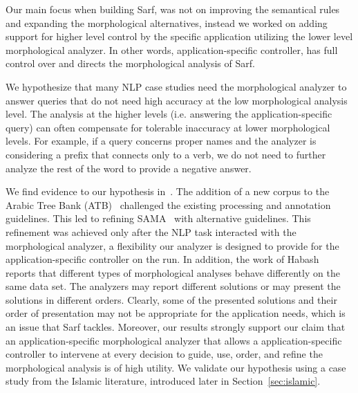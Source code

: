 \documentclass[11pt]{article}
\begin{document}
Our main focus when building Sarf, was not on improving the semantical rules and expanding the morphological alternatives, instead we worked on adding support for higher level control by the specific application utilizing the lower level morphological analyzer. In other words, application-specific controller, has full control over and directs the morphological analysis of Sarf. %

We hypothesize that many NLP case studies need the 
morphological analyzer to answer queries that do not need 
high accuracy at the low morphological analysis level.
The analysis at the higher levels 
(i.e. answering the application-specific query)
can often compensate for 
tolerable inaccuracy at lower morphological levels. 
For example, if a query concerns proper names and the 
analyzer is considering a 
prefix that connects only to a verb,
we do not need to further analyze the rest of the word 
to provide a negative answer.

We find evidence to our hypothesis in~\cite{Maamouri:10}.
The addition of a new corpus to the Arabic Tree Bank 
(ATB)~\cite{Maamouri:04}
challenged the existing processing and 
annotation guidelines. 
This led to refining 
SAMA~\cite{Kulick:10} with 
alternative guidelines. 
This refinement was achieved only after the NLP 
task interacted with the morphological analyzer,
a flexibility our analyzer is designed to provide for the application-specific controller on the run. %
In addition, 
the work of Habash~ reports that different 
types of morphological analyses behave differently on the same %
data set.
The analyzers may report different solutions or 
may present the solutions in different orders. 
Clearly, some of 
the presented solutions and their order of presentation may not be 
appropriate for the %
application needs, which is an issue that Sarf tackles. %
Moreover, our results strongly support our claim that
an application-specific morphological analyzer that allows a application-specific 
controller to intervene at every decision to guide, use, order, and 
refine the morphological analysis is of high utility.
We validate our hypothesis using a case study from the Islamic 
literature, introduced later in Section~\ref{sec:islamic}.
\end{document}
